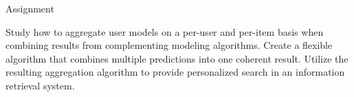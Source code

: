 \null\vspace{8em}
{
  \centering
  \normalfont
  \huge
  Assignment\\
}
\vspace{2em}

\noindent
Study how to aggregate user models on a per-user and per-item
basis when combining results from complementing modeling algorithms.
Create a flexible algorithm that combines multiple predictions
into one coherent result.
Utilize the resulting aggregation algorithm
to provide personalized search in an information retrieval system.

\clearpage
